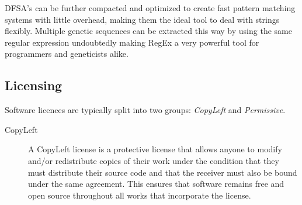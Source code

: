 DFSA's can be further compacted and optimized to create fast pattern matching systems with little overhead, making them the ideal tool to deal with strings flexibly. Multiple genetic sequences can be extracted this way by using the same regular expression undoubtedly making RegEx a very powerful tool for programmers and geneticists alike.

\subsection{Licensing}\label{ref:app:licensing}

Software licences are typically split into two groups: \textit{CopyLeft} and \textit{Permissive}.

\begin{description}
\item[CopyLeft]{
A CopyLeft license is a protective license that allows anyone to modify and/or redistribute copies of their work under the condition that they must distribute their source code and that the receiver must also be bound under the same agreement. This ensures that software remains free and open source throughout all works that incorporate the license.

}
\end{description}
